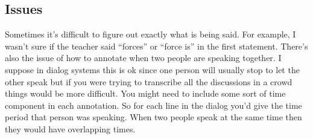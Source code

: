 \documentclass[10pt]{article}
\begin{document}
\subsection{Issues}
Sometimes it's difficult to figure out exactly what is being said.  For 
example, I wasn't sure if the teacher said ``forces'' or ``force is'' in 
the first statement.  There's also the issue of how to annotate when two 
people are speaking together.  I suppose in dialog systems this is ok since
one person will usually stop to let the other speak but if you were trying
to transcribe all the discussions in a crowd things would be more difficult.
You might need to include some sort of time component in each annotation.
So for each line in the dialog you'd give the time period that person was
speaking.  When two people speak at the same time then they would have 
overlapping times.
\end{document}
